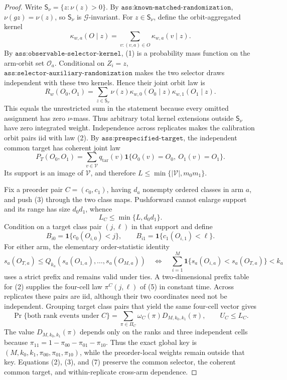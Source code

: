 \documentclass{article}
\begin{document}
\begin{proof}
Write \(\mathsf S_\nu=\{z:\nu(z)>0\}\). By \(\texttt{ass:known-matched-randomization}\), \(\nu(gz)=\nu(z)\), so \(\mathsf S_\nu\) is \(\mathcal G\)-invariant. For \(z\in\mathsf S_\nu\), define the orbit-aggregated kernel
\[
\kappa_{w,a}(O\mid z)=\sum_{v:(v,a)\in O}\kappa_{w,a}(v\mid z).
\tag{1}
\]
By \(\texttt{ass:observable-selector-kernel}\), (1) is a probability mass function on the arm-orbit set \(\mathcal O_a\). Conditional on \(Z_i=z\), \(\texttt{ass:selector-auxiliary-randomization}\) makes the two selector draws independent with these two kernels. Hence their joint orbit law is
\[
R_w(O_0,O_1)=\sum_{z\in\mathsf S_\nu}\nu(z)\kappa_{w,0}(O_0\mid z)\kappa_{w,1}(O_1\mid z).
\tag{2}
\]
This equals the unrestricted sum in the statement because every omitted assignment has zero \(\nu\)-mass. Thus arbitrary total kernel extensions outside \(\mathsf S_\nu\) have zero integrated weight. Independence across replicates makes the calibration orbit pairs iid with law (2). By \(\texttt{ass:prespecified-target}\), the independent common target has coherent joint law
\[
P_T(O_0,O_1)=\sum_{v\in\mathcal V}q_{\mathrm{tar}}(v)\mathbf 1\{O_0(v)=O_0,\ O_1(v)=O_1\}.
\tag{3}
\]
Its support is an image of \(\mathcal V\), and therefore \(L\le\min\{|\mathcal V|,m_0m_1\}\).

Fix a preorder pair \(C=(c_0,c_1)\), having \(d_a\) nonempty ordered classes in arm \(a\), and push (3) through the two class maps. Pushforward cannot enlarge support and its range has size \(d_0d_1\), whence
\[
L_C\le\min\{L,d_0d_1\}.
\tag{4}
\]
Condition on a target class pair \((j,\ell)\) in that support and define
\[
B_{i0}=\mathbf 1\{c_0(O_{i,0})<j\},\qquad B_{i1}=\mathbf 1\{c_1(O_{i,1})<\ell\}.
\tag{5}
\]
For either arm, the elementary order-statistic identity
\[
s_a(O_{T,a})\le Q_{k_a}(s_a(O_{1,a}),\ldots,s_a(O_{M,a}))
\quad\Longleftrightarrow\quad
\sum_{i=1}^M\mathbf 1\{s_a(O_{i,a})<s_a(O_{T,a})\}<k_a
\tag{6}
\]
uses a strict prefix and remains valid under ties. A two-dimensional prefix table for (2) supplies the four-cell law \(\pi^C(j,\ell)\) of (5) in constant time. Across replicates these pairs are iid, although their two coordinates need not be independent. Grouping target class pairs that yield the same four-cell vector gives
\[
\Pr\{\text{both rank events under }C\}
=\sum_{\pi\in\Pi_C}\omega_C(\pi)D_{M,k_0,k_1}(\pi),\qquad U_C\le L_C.
\tag{7}
\]
The value \(D_{M,k_0,k_1}(\pi)\) depends only on the ranks and three independent cells because \(\pi_{11}=1-\pi_{00}-\pi_{01}-\pi_{10}\). Thus the exact global key is \((M,k_0,k_1,\pi_{00},\pi_{01},\pi_{10})\), while the preorder-local weights remain outside that key. Equations (2), (3), and (7) preserve the common selector, the coherent common target, and within-replicate cross-arm dependence.


\end{proof}
\end{document}

